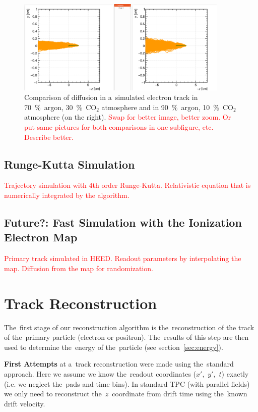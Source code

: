 \documentclass[]{article}
\begin{document}
	\begin{figure}
		\centering
		\includegraphics[width=0.9\textwidth]{diff_comp.png}
		\caption{Comparison of diffusion in a~simulated electron track in 70~\%~argon, 30~\%~CO$_2$ atmosphere and in 90~\%~argon, 10~\%~CO$_2$ atmosphere (on the right). \textcolor{red}{Swap for better image, better zoom. Or put same pictures for both comparisons in one subfigure, etc. Describe better.}}
		\label{fig:diffcomp}
	\end{figure}
	
	\subsection{Runge-Kutta Simulation}
	\label{sec:rks}
	\textcolor{red}{Trajectory simulation with 4th order Runge-Kutta. Relativistic equation that is numerically integrated by the algorithm.}
	
	\subsection{Future?: Fast Simulation with the Ionization Electron Map}
	\textcolor{red}{Primary track simulated in HEED. Readout parameters by interpolating the map. Diffusion from the map for randomization.}
	
	\section{Track Reconstruction}
	\label{sec:track}
	The~first stage of our reconstruction algorithm is the~reconstruction of the track of the~primary particle (electron or positron). The~results of this step are then used to determine the~energy of the~particle (see section~\ref{sec:energy}).
	
	\textbf{First Attempts} at a~track reconstruction were made using the~standard approach. Here we assume we know the~readout coordinates ($x'$,~$y'$,~$t$) exactly (i.e. we neglect the~pads and time bins). In standard TPC (with parallel fields) we only need to reconstruct the~$z$~coordinate from drift time using the~known drift velocity.
	
\end{document}
